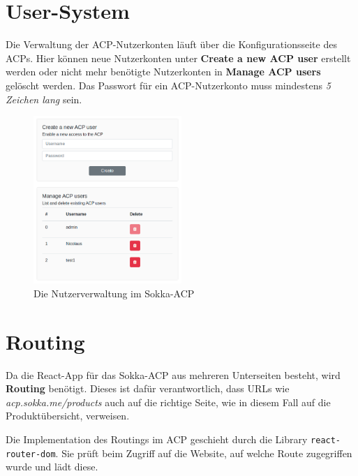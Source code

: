 \section{User-System}
\label{acp-usersystem}

Die Verwaltung der ACP-Nutzerkonten läuft über die Konfigurationsseite des ACPs. Hier können neue Nutzerkonten unter \textbf{Create a new ACP user} erstellt werden oder nicht mehr benötigte Nutzerkonten in \textbf{Manage ACP users} gelöscht werden. Das Passwort für ein ACP-Nutzerkonto muss mindestens \textit{5 Zeichen lang} sein.

\begin{figure}[ht]
    \centering
    \includegraphics[width=0.5\textwidth]{images/ACP/users.png}
    \caption{Die Nutzerverwaltung im Sokka-ACP}
\end{figure}

\section{Routing}

Da die React-App für das Sokka-ACP aus mehreren Unterseiten besteht, wird \textbf{Routing} benötigt. Dieses ist dafür verantwortlich, dass URLs wie \textit{acp.sokka.me/products} auch auf die richtige Seite, wie in diesem Fall auf die Produktübersicht, verweisen.

Die Implementation des Routings im ACP geschieht durch die Library \lstinline{react-router-dom}. Sie prüft beim Zugriff auf die Website, auf welche Route zugegriffen wurde und lädt diese.

